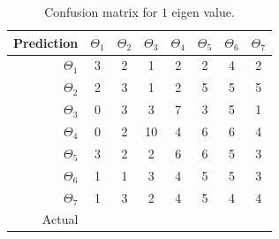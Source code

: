 \documentclass[runningheads,a4paper]{llncs}
\begin{document}
\begin{table}
\centering
\caption{Confusion matrix for $1$ eigen value.}
\label{tab:conf1}
\begin{tabular}{@{}r|ccccccc@{}}
\toprule
Prediction & \multicolumn{1}{r}{$\Theta_1$} & \multicolumn{1}{r}{$\Theta_2$} & \multicolumn{1}{r}{$\Theta_3$} & \multicolumn{1}{r}{$\Theta_4$} & \multicolumn{1}{r}{$\Theta_5$} & \multicolumn{1}{r}{$\Theta_6$} & \multicolumn{1}{r}{$\Theta_7$} \\ \midrule
$\Theta_1$ & 3                              & 2                              & 1                              & 2                              & 2                              & 4                              & 2                              \\
$\Theta_2$ & 2                              & 3                              & 1                              & 2                              & 5                              & 5                              & 5                              \\
$\Theta_3$ & 0                              & 3                              & 3                              & 7                              & 3                              & 5                              & 1                              \\
$\Theta_4$ & 0                              & 2                              & 10                             & 4                              & 6                              & 6                              & 4                              \\
$\Theta_5$ & 3                              & 2                              & 2                              & 6                              & 6                              & 5                              & 3                              \\
$\Theta_6$ & 1                              & 1                              & 3                              & 4                              & 5                              & 5                              & 3                              \\
$\Theta_7$ & 1                              & 3                              & 2                              & 4                              & 5                              & 4                              & 4                              \\ \midrule
Actual     & \multicolumn{1}{l}{}           & \multicolumn{1}{l}{}           & \multicolumn{1}{l}{}           & \multicolumn{1}{l}{}           & \multicolumn{1}{l}{}           & \multicolumn{1}{l}{}           & \multicolumn{1}{l}{}           \\ \cmidrule(r){1-1}
\end{tabular}
\end{table}
\end{document}

